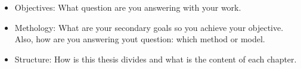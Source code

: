 \begin{itemize}
	\item Objectives: What question are you answering with your work.\\
	\item Methology: What are your secondary goals so you achieve your objective. Also, how are you answering yout question: which method or model.\\
	\item Structure: How is this thesis divides and what is the content of each chapter.
\end{itemize}






















